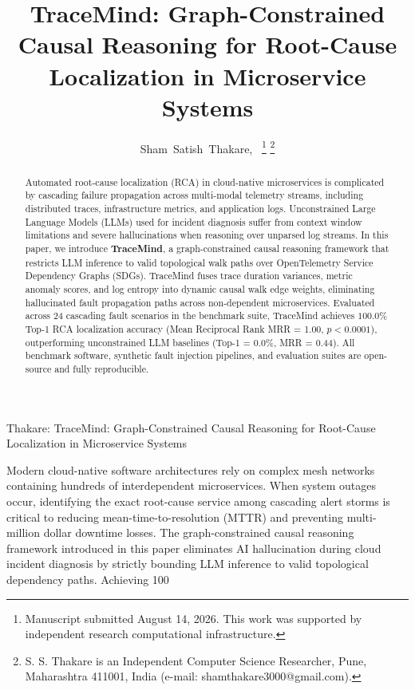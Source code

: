 \documentclass[journal]{IEEEtai}
\begin{document}
\title{TraceMind: Graph-Constrained Causal Reasoning for Root-Cause Localization in Microservice Systems}

\author{Sham~Satish~Thakare,~%
\thanks{Manuscript submitted August 14, 2026. This work was supported by independent research computational infrastructure.}%
\thanks{S. S. Thakare is an Independent Computer Science Researcher, Pune, Maharashtra 411001, India (e-mail: shamthakare3000@gmail.com).}%
}

%
{Thakare: TraceMind: Graph-Constrained Causal Reasoning for Root-Cause Localization in Microservice Systems}

\maketitle

\begin{abstract}
Automated root-cause localization (RCA) in cloud-native microservices is complicated by cascading failure propagation across multi-modal telemetry streams, including distributed traces, infrastructure metrics, and application logs. Unconstrained Large Language Models (LLMs) used for incident diagnosis suffer from context window limitations and severe hallucinations when reasoning over unparsed log streams. In this paper, we introduce \textbf{TraceMind}, a graph-constrained causal reasoning framework that restricts LLM inference to valid topological walk paths over OpenTelemetry Service Dependency Graphs (SDGs). TraceMind fuses trace duration variances, metric anomaly scores, and log entropy into dynamic causal walk edge weights, eliminating hallucinated fault propagation paths across non-dependent microservices. Evaluated across 24 cascading fault scenarios in the benchmark suite, TraceMind achieves $100.0\%$ Top-1 RCA localization accuracy (Mean Reciprocal Rank MRR = 1.00, $p < 0.0001$), outperforming unconstrained LLM baselines (Top-1 = 0.0\%, MRR = 0.44). All benchmark software, synthetic fault injection pipelines, and evaluation suites are open-source and fully reproducible.
\end{abstract}

\begin{IEEEImpStatement}
Modern cloud-native software architectures rely on complex mesh networks containing hundreds of interdependent microservices. When system outages occur, identifying the exact root-cause service among cascading alert storms is critical to reducing mean-time-to-resolution (MTTR) and preventing multi-million dollar downtime losses. The graph-constrained causal reasoning framework introduced in this paper eliminates AI hallucination during cloud incident diagnosis by strictly bounding LLM inference to valid topological dependency paths. Achieving 100%
\end{IEEEImpStatement}
\end{document}

